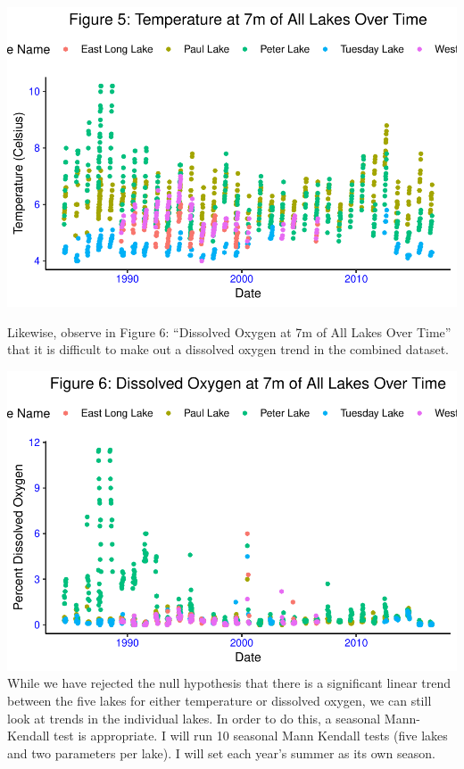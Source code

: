\documentclass[12pt,]{article}
\begin{document}
\includegraphics{KBollt_ENV872_FinalProject_files/figure-latex/visualization5-1.pdf}

Likewise, observe in Figure 6: ``Dissolved Oxygen at 7m of All Lakes
Over Time'' that it is difficult to make out a dissolved oxygen trend in
the combined dataset.

\includegraphics{KBollt_ENV872_FinalProject_files/figure-latex/visualization6-1.pdf}
While we have rejected the null hypothesis that there is a significant
linear trend between the five lakes for either temperature or dissolved
oxygen, we can still look at trends in the individual lakes. In order to
do this, a seasonal Mann-Kendall test is appropriate. I will run 10
seasonal Mann Kendall tests (five lakes and two parameters per lake). I
will set each year's summer as its own season.
\end{document}
